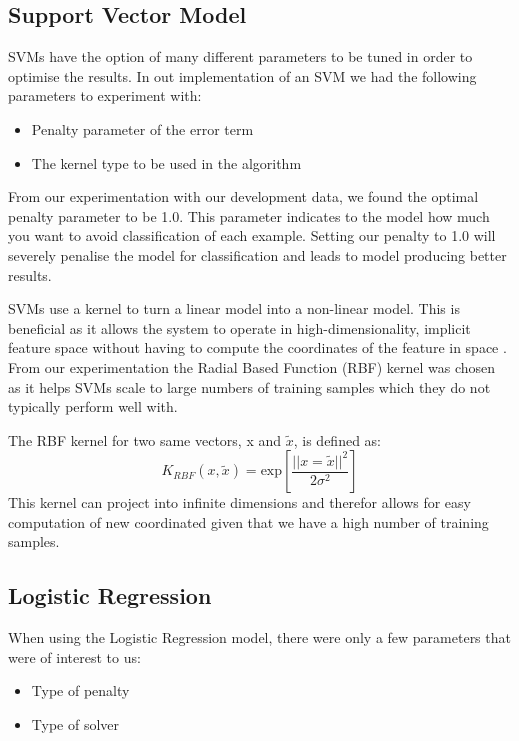 \documentclass[bsc,frontabs,twoside,singlespacing,parskip,deptreport]{infthesis}     %
\begin{document}
 \subsection{Support Vector Model}
 SVMs have the option of many different parameters to be tuned in order to optimise the results.
 In out implementation of an SVM we had the following parameters to experiment with:
 \begin{itemize}
 \item Penalty parameter of the error term
 \item The kernel type to be used in the algorithm
 \end{itemize}

 From our experimentation with our development data, we found the optimal penalty parameter to be 1.0.
 This parameter indicates to the model how much you want to avoid classification of each example.
 Setting our penalty to 1.0 will severely penalise the model for classification and leads to model producing
 better results.

 SVMs use a kernel to turn a linear model into a non-linear model. This is beneficial as it allows the system
 to operate in high-dimensionality, implicit feature space without having to compute the coordinates of the feature
 in space \cite{hofmann2008kernel}.
 From our experimentation the Radial Based Function (RBF) kernel was chosen as it helps SVMs scale to large numbers of
 training samples which they do not typically perform well with.

 The RBF kernel for two same vectors, x and $\tilde{x}$, is defined as:
 \begin{equation}
   K_{RBF} (x, \tilde{x}) = \text{exp}[ \frac{||x =\tilde{x}||^2}{2\sigma^2}]\nonumber
 \end{equation}
\cite{hofmann2008kernel}
 This kernel can project into infinite dimensions and therefor allows for easy computation of new coordinated given that
 we have a high number of training samples.
 
 \subsection{Logistic Regression}\label{sec:log-reg}
 When using the Logistic Regression model, there were only a few parameters that were of interest to us:
 \begin{itemize}
   \item Type of penalty
   \item Type of solver
 \end{itemize}
\end{document}
